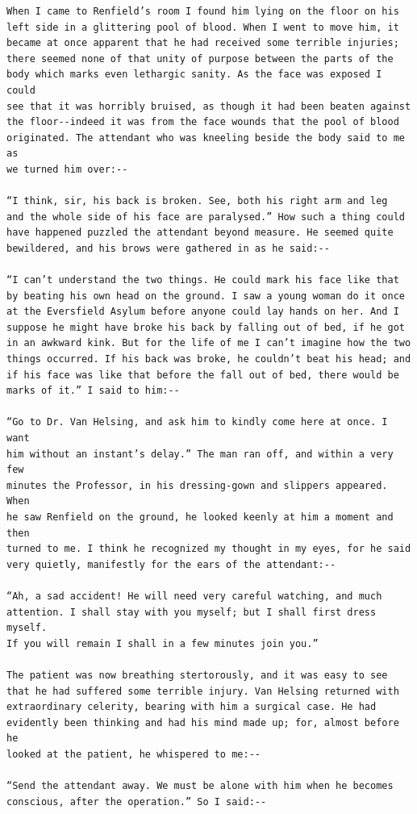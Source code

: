 \documentclass{article}
\begin{document}
\begin{verbatim}
When I came to Renfield’s room I found him lying on the floor on his
left side in a glittering pool of blood. When I went to move him, it
became at once apparent that he had received some terrible injuries;
there seemed none of that unity of purpose between the parts of the
body which marks even lethargic sanity. As the face was exposed I could
see that it was horribly bruised, as though it had been beaten against
the floor--indeed it was from the face wounds that the pool of blood
originated. The attendant who was kneeling beside the body said to me as
we turned him over:--

“I think, sir, his back is broken. See, both his right arm and leg
and the whole side of his face are paralysed.” How such a thing could
have happened puzzled the attendant beyond measure. He seemed quite
bewildered, and his brows were gathered in as he said:--

“I can’t understand the two things. He could mark his face like that
by beating his own head on the ground. I saw a young woman do it once
at the Eversfield Asylum before anyone could lay hands on her. And I
suppose he might have broke his back by falling out of bed, if he got
in an awkward kink. But for the life of me I can’t imagine how the two
things occurred. If his back was broke, he couldn’t beat his head; and
if his face was like that before the fall out of bed, there would be
marks of it.” I said to him:--

“Go to Dr. Van Helsing, and ask him to kindly come here at once. I want
him without an instant’s delay.” The man ran off, and within a very few
minutes the Professor, in his dressing-gown and slippers appeared. When
he saw Renfield on the ground, he looked keenly at him a moment and then
turned to me. I think he recognized my thought in my eyes, for he said
very quietly, manifestly for the ears of the attendant:--

“Ah, a sad accident! He will need very careful watching, and much
attention. I shall stay with you myself; but I shall first dress myself.
If you will remain I shall in a few minutes join you.”

The patient was now breathing stertorously, and it was easy to see
that he had suffered some terrible injury. Van Helsing returned with
extraordinary celerity, bearing with him a surgical case. He had
evidently been thinking and had his mind made up; for, almost before he
looked at the patient, he whispered to me:--

“Send the attendant away. We must be alone with him when he becomes
conscious, after the operation.” So I said:--


\end{verbatim}
\end{document}
